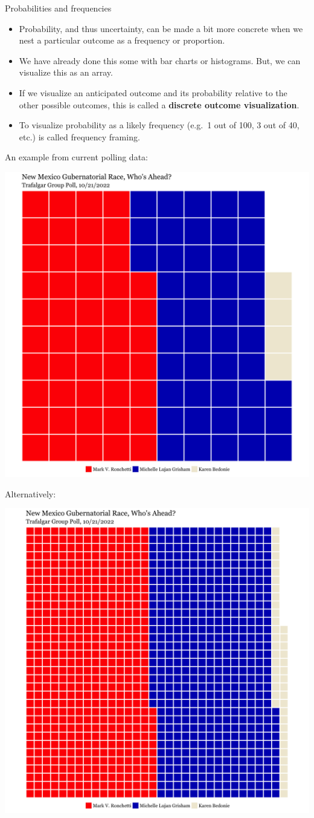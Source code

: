 \documentclass[
  ignorenonframetext,
]{beamer}
\begin{document}
\begin{frame}{Probabilities and frequencies}
\protect\hypertarget{probabilities-and-frequencies}{}
\begin{itemize}
\item
  Probability, and thus uncertainty, can be made a bit more concrete
  when we nest a particular outcome as a frequency or proportion.
\item
  We have already done this some with bar charts or histograms. But, we
  can visualize this as an array.
\item
  If we visualize an anticipated outcome and its probability relative to
  the other possible outcomes, this is called a \textbf{discrete outcome
  visualization}.
\item
  To visualize probability as a likely frequency (e.g.~1 out of 100, 3
  out of 40, etc.) is called frequency framing.
\end{itemize}
\end{frame}

\begin{frame}{An example from current polling data:}
\protect\hypertarget{an-example-from-current-polling-data}{}
\centering

\includegraphics[width=0.65\linewidth,height=0.8\textheight]{trafalgar_pct}
\end{frame}

\begin{frame}{Alternatively:}
\protect\hypertarget{alternatively}{}
\centering

\includegraphics[width=0.65\linewidth,height=0.8\textheight]{trafalgar_full}
\end{frame}
\end{document}

